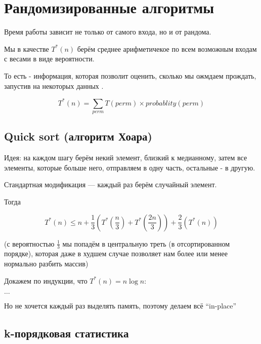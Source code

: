 \documentclass[
]{article}
\author{}
\date{}
\begin{document}
\hypertarget{ux440ux430ux43dux434ux43eux43cux438ux437ux438ux440ux43eux432ux430ux43dux43dux44bux435-ux430ux43bux433ux43eux440ux438ux442ux43cux44b}{%
\section{Рандомизированные
алгоритмы}\label{ux440ux430ux43dux434ux43eux43cux438ux437ux438ux440ux43eux432ux430ux43dux43dux44bux435-ux430ux43bux433ux43eux440ux438ux442ux43cux44b}}

Время работы зависит не только от самого входа, но и от рандома.

Мы в качестве \(T^*(n)\) берём среднее арифметичекое по всем возможным
входам с весами в виде вероятности.

То есть - информация, которая позволит оценить, сколько мы ожмдаем
прождать, запустив на некоторых данных .

\[T^*(n) = \sum_{perm} {T(perm)\times probablity(perm)}\]

\hypertarget{quick-sort-ux430ux43bux433ux43eux440ux438ux442ux43c-ux445ux43eux430ux440ux430}{%
\subsection{Quick sort (алгоритм
Хоара)}\label{quick-sort-ux430ux43bux433ux43eux440ux438ux442ux43c-ux445ux43eux430ux440ux430}}

Идея: на каждом шагу берём некий элемент, близкий к медианному, затем
все элементы, которые больше него, отправляем в одну часть, остальные -
в другую.

Стандартная модификация --- каждый раз берём случайный элемент.

Тогда

\[T^*(n) \leqslant n + \frac{1}{3}\left( T^*\left(\frac{n}{3}\right) + T^*\left(\frac{2n}{3}\right) \right) + \frac{2}{3}\left( T^*\left(n\right) \right)\]

(с вероятностью \(\frac{1}{3}\) мы попадём в центральную треть (в
отсортированном порядке), которая даже в худшем случае позволяет нам
более или менее нормально разбить массив)

Докажем по индукции, что \(T^*(n) = n \log n\):

\(\ldots\)

Но не хочется каждый раз выделять память, поэтому делаем всё
``in-place''

\hypertarget{k-ux43fux43eux440ux44fux434ux43aux43eux432ux430ux44f-ux441ux442ux430ux442ux438ux441ux442ux438ux43aux430}{%
\subsection{k-порядковая
статистика}\label{k-ux43fux43eux440ux44fux434ux43aux43eux432ux430ux44f-ux441ux442ux430ux442ux438ux441ux442ux438ux43aux430}}
\end{document}
